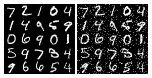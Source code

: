 \documentclass{article}
\begin{document}
\begin{figure}[h]
\centering
\begin{minipage}{.3\textwidth}
	\centering
	\includegraphics[width=\textwidth]{graphics/digits.jpg}
\end{minipage}
\begin{minipage}{.3\textwidth}
	\centering
	\includegraphics[width=\textwidth]{graphics/digits_spoiled10percent.jpg}

\end{minipage}
\end{figure}
\end{document}
